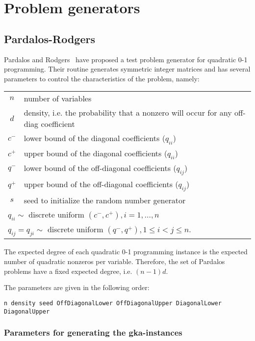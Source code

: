 \documentclass[a4paper, 12pt]{article}
\begin{document}
\section{Problem generators}

\subsection{Pardalos-Rodgers} \label{sec:pardalos}
Pardalos and Rodgers~\cite{PaRo:90} have proposed a test
problem generator for quadratic 0-1 programming. Their
routine generates symmetric integer matrices and has several
parameters to control the characteristics of the problem, namely: 

\medskip
\noindent
\begin{tabular}{cl}
$n$ & number of variables\\
$d$ & density, i.e. the probability that a nonzero will occur for any
off-diag coefficient\\ 
$c^{-}$& lower bound of the diagonal coefficients ($q_{ii}$)\\
$c^{+}$& upper bound of the diagonal coefficients ($q_{ii}$)\\
$q^{-}$& lower bound of the off-diagonal coefficients ($q_{ij}$)\\
$q^{+}$& upper bound of the off-diagonal coefficients ($q_{ij}$)\\
$s$ & seed to initialize the random number generator\\
\multicolumn{2}{l}{$q_{ii} \sim $ discrete uniform
  $(c^{-},c^{+}),i=1,\dots,n$}\\ 
\multicolumn{2}{l}{$q_{ij}=q_{ji} \sim $ discrete uniform
  $(q^{-},q^{+}),1 \le i<j \le n.$} 
\end{tabular}

\medskip
\noindent
The expected degree of each quadratic 0-1 programming instance is the 
expected number of quadratic nonzeros per variable. Therefore, the set
of Pardalos problems have a fixed expected degree, i.e. $(n-1)d$.

The parameters are given in the following order:
\begin{verbatim}   
n density seed OffDiagonalLower OffDiagonalUpper DiagonalLower DiagonalUpper
\end{verbatim}





\subsubsection*{Parameters for generating the gka-instances} 
\end{document}
